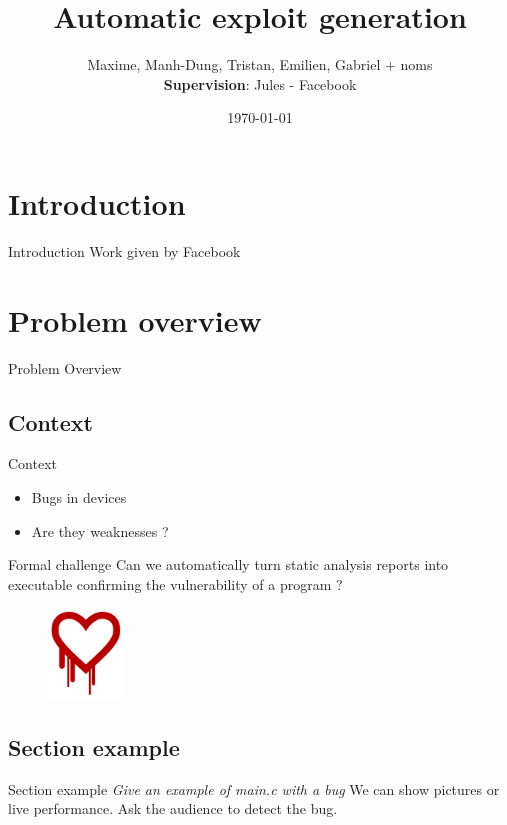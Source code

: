 \documentclass{beamer}
\title{Automatic exploit generation}
\author{Maxime, Manh-Dung, Tristan, Emilien, Gabriel + noms \\
\textbf{Supervision}: Jules - Facebook}
\institute{REDOCS 2020}
\date{\today}
\begin{document}
\begin{frame}
\titlepage
\end{frame}

\section*{Introduction}
\begin{frame}{Introduction}
\centering
Work given by Facebook
\end{frame}







\section{Problem overview}

\begin{frame}
\centering
\LARGE
Problem Overview
\end{frame}

\subsection{Context}

\begin{frame}{Context}

\begin{itemize}
\item Bugs in devices
\item Are they weaknesses ?
\end{itemize}
\begin{block}{Formal challenge}
Can we automatically turn static analysis reports into executable confirming the vulnerability of a program ?
\end{block}
\begin{figure}
\includegraphics[width = 2cm]{Figures/HeartbleedLogo.png}
\end{figure}

\end{frame}

\subsection*{Section example}
\begin{frame}{Section example}
\textit{Give an example of main.c with a bug}
We can show pictures or live performance. Ask the audience to detect the bug.
\end{frame}
\end{document}
